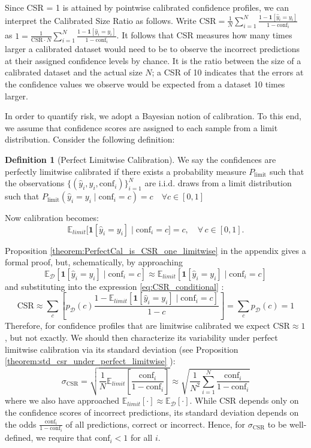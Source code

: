 \documentclass{article}
\theoremstyle{plain}
\theoremstyle{definition}
\newtheorem{definition}{Definition}
\theoremstyle{remark}
\begin{document}
Since CSR = 1 is attained by pointwise calibrated confidence profiles, we can interpret the Calibrated Size Ratio as follows. Write  $\text{CSR} = \frac{1}{N}\sum_{i=1}^N \frac{1 - \mathbf{1}[\hat{y}_i = y_i]}{1 - \text{conf}_i} $ as $ 
1 = \frac{1}{\text{CSR} \cdot N}\sum_{i=1}^N \frac{1 - \mathbf{1}[\hat{y}_i = y_i]}{1 - \text{conf}_i}$. It follows that CSR measures how many times larger a calibrated dataset would need to be to observe the incorrect predictions at their assigned confidence levels by chance. It is the ratio between the size of a calibrated dataset and the actual size $N$; a CSR of 10 indicates that the errors at the confidence values we observe would be expected from a dataset 10 times larger.  
\bigskip

In order to quantify risk, we adopt a Bayesian notion of calibration. To this end, we assume that confidence scores are assigned to each sample from a limit distribution. Consider the following definition:

\begin{definition}[Perfect Limitwise Calibration]\label{def:limit_calibration}
We say the confidences are perfectly limitwise calibrated if there exists a probability measure $P_{\text{limit}}$ such that the observations $\{(\hat{y}_i, y_i, \text{conf}_i)\}_{i=1}^N$ are i.i.d. draws from a limit distribution such that $P_{\text{limit}}(\hat{y}_i = y_i \mid \text{conf}_i = c) = c \quad \forall c \in [0,1]$
\end{definition}
\smallskip
Now calibration becomes: \begin{equation}
    \mathbb{E}_{limit}\big[\mathbf{1}[\hat{y}_i = y_i] \mid \mathrm{conf}_i = c\big] = c, 
    \quad \forall\, c \in [0,1].
    \label{eq:pointwise_calibration}
\end{equation}

Proposition \ref{theorem:PerfectCal_is_CSR_one_limitwise} in the appendix gives a formal proof, but, schematically, by approaching \[
\mathbb{E}_{\mathcal{D}}[  \mathbf{1}[\hat{y}_i = y_i]  \mid \mathrm{conf}_i = c ]   \approx \mathbb{E}_{limit}[  \mathbf{1}[\hat{y}_i = y_i]  \mid \mathrm{conf}_i = c ] 
\] and substituting into the expression \ref{eq:CSR_conditional} : \[
\text{CSR} \approx  \sum_c \left[p_{\mathcal{D}}(c) \frac{1 -  \mathbb{E}_{limit}[  \mathbf{1}[\hat{y}_i = y_i]  \mid \mathrm{conf}_i = c ]}{1 - c}\right] = \sum_c p_{\mathcal{D}}(c) = 1
\]
Therefore, for confidence profiles that are limitwise calibrated we expect $\mathrm{CSR} \approx 1$, but not exactly. We should then characterize its variability under perfect limitwise calibration via its standard deviation (see Proposition~ \ref{theorem:std_csr_under_perfect_limitwise} ): \[ 
\sigma_{\text{CSR}} = \sqrt{\frac{1}{N}\mathbb{E}_{limit} \left[\frac{\text{conf}_i}{1-\text{conf}_i}\right]} \approx   \sqrt{\frac{1}{N^2}\sum_{i=1}^N \frac{\text{conf}_i}{1-\text{conf}_i}}  
\]
where we also have approached $\mathbb{E}_{limit}[\cdot ] \approx \mathbb{E}_{\mathcal{D}}[\cdot  ]$. While $\mathrm{CSR}$ depends only on the confidence scores of incorrect predictions, its standard deviation depends on the odds $\frac{\mathrm{conf}_i}{1 - \mathrm{conf}_i}$ of all predictions, correct or incorrect. Hence, for $\sigma_{\text{CSR}} $ to be well-defined, we require that $\mathrm{conf}_i < 1$ for all $i$.
\end{document}
